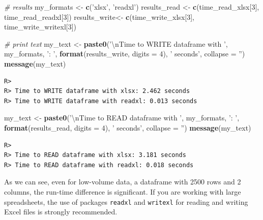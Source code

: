 \documentclass[
  12pt,
]{book}
\newenvironment{Shaded}{\begin{snugshade}}{\end{snugshade}}
\newcommand{\CharTok}[1]{\textcolor[rgb]{0.5,0.5,0.5}{#1}}
\newcommand{\CommentTok}[1]{\textcolor[rgb]{0.37,0.37,0.37}{\textit{#1}}}
\newcommand{\DataTypeTok}[1]{\textcolor[rgb]{0.27,0.27,0.27}{#1}}
\newcommand{\DecValTok}[1]{\textcolor[rgb]{0.06,0.06,0.06}{#1}}
\newcommand{\KeywordTok}[1]{\textcolor[rgb]{0.27,0.27,0.27}{\textbf{#1}}}
\newcommand{\NormalTok}[1]{#1}
\newcommand{\StringTok}[1]{\textcolor[rgb]{0.5,0.5,0.5}{#1}}
\begin{document}
\begin{Shaded}
\begin{Highlighting}[]
\CommentTok{# results}
\NormalTok{my_formats <-}\StringTok{ }\KeywordTok{c}\NormalTok{(}\StringTok{'xlsx'}\NormalTok{, }\StringTok{'readxl'}\NormalTok{)}
\NormalTok{results_read <-}\StringTok{ }\KeywordTok{c}\NormalTok{(time_read_xlsx[}\DecValTok{3}\NormalTok{], time_read_readxl[}\DecValTok{3}\NormalTok{])}
\NormalTok{results_write<-}\StringTok{ }\KeywordTok{c}\NormalTok{(time_write_xlsx[}\DecValTok{3}\NormalTok{], time_write_writexl[}\DecValTok{3}\NormalTok{])}

\CommentTok{# print text}
\NormalTok{my_text <-}\StringTok{ }\KeywordTok{paste0}\NormalTok{(}\StringTok{'}\CharTok{\textbackslash{}n}\StringTok{Time to WRITE dataframe with '}\NormalTok{,}
\NormalTok{                  my_formats, }\StringTok{': '}\NormalTok{,}
                  \KeywordTok{format}\NormalTok{(results_write, }\DataTypeTok{digits =} \DecValTok{4}\NormalTok{),}
                  \StringTok{' seconds'}\NormalTok{, }\DataTypeTok{collapse =} \StringTok{''}\NormalTok{)}
\KeywordTok{message}\NormalTok{(my_text)}
\end{Highlighting}
\end{Shaded}

\begin{verbatim}
R> 
R> Time to WRITE dataframe with xlsx: 2.462 seconds
R> Time to WRITE dataframe with readxl: 0.013 seconds
\end{verbatim}

\begin{Shaded}
\begin{Highlighting}[]
\NormalTok{my_text <-}\StringTok{ }\KeywordTok{paste0}\NormalTok{(}\StringTok{'}\CharTok{\textbackslash{}n}\StringTok{Time to READ dataframe with '}\NormalTok{,}
\NormalTok{                  my_formats, }\StringTok{': '}\NormalTok{,}
                  \KeywordTok{format}\NormalTok{(results_read, }\DataTypeTok{digits =} \DecValTok{4}\NormalTok{),}
                  \StringTok{' seconds'}\NormalTok{, }\DataTypeTok{collapse =} \StringTok{''}\NormalTok{)}
\KeywordTok{message}\NormalTok{(my_text)}
\end{Highlighting}
\end{Shaded}

\begin{verbatim}
R> 
R> Time to READ dataframe with xlsx: 3.181 seconds
R> Time to READ dataframe with readxl: 0.018 seconds
\end{verbatim}

As we can see, even for low-volume data, a dataframe with 2500 rows and 2 columns, the run-time difference is significant. If you are working with large spreadsheets, the use of packages \texttt{readxl} and \texttt{writexl} for reading and writing Excel files is strongly recommended.
\end{document}
